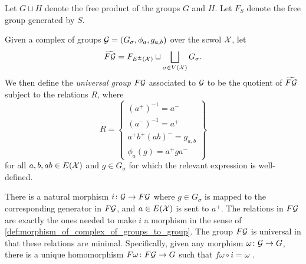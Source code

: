 Let $G \sqcup H$ denote the free product of the groups $G$ and $H$.
Let $F_S$ denote the free group generated by  $S$.
\begin{definition}
	Given a complex of groups $\mathcal{G} = (G_\sigma, \phi_a, g_{a,b})$ over the scwol $\mathcal{X}$, let
	\[
		\widetilde{F\mathcal{G}} =  F_{E^\pm(\mathcal{X})} \sqcup \bigsqcup_{\sigma \in V(\mathcal{X})} G_\sigma
		.\]
	We then define the \emph{universal group} $F\mathcal{G}$ associated to $\mathcal{G}$ to be the quotient of $\widetilde{F\mathcal{G}}$ subject to the relations  $R$, where
	\[
		R = \left\{
		\begin{array}{l}
			(a^+)^{-1}   = a^-     \\
			(a^-)^{-1}   = a^+     \\
			a^+b^+(ab)^- = g_{a,b} \\
			\phi_a(g)    = a^+ga^-
		\end{array}
		\right\}
	\]
	for all $a,b,ab \in E(\mathcal{X})$ and $g \in G_\sigma$ for which the relevant expression is well-defined.
\end{definition}
There is a natural morphism $i \colon \mathcal{G} \to F\mathcal{G}$ where $g \in G_\sigma$ is mapped to the corresponding generator in $F\mathcal{G}$, and  $a \in E(\mathcal{X})$ is sent to $a^+$.
The relations in $F\mathcal{G}$ are exactly the ones needed to make  $i$ a morphism in the sense of \cref{def:morphism_of_complex_of_groups_to_group}.
The group $F\mathcal{G}$ is universal in that these relations are minimal.
Specifically, given any morphism $\omega \colon \mathcal{G} \to G$, there is a unique homomorphism $F\omega \colon F\mathcal{G} \to G$ such that $f\omega \circ i = \omega$ \cite[Chapter 3.\textrm{\ensuremath{\calc}}, Section 3.2]{BrHa11}.

